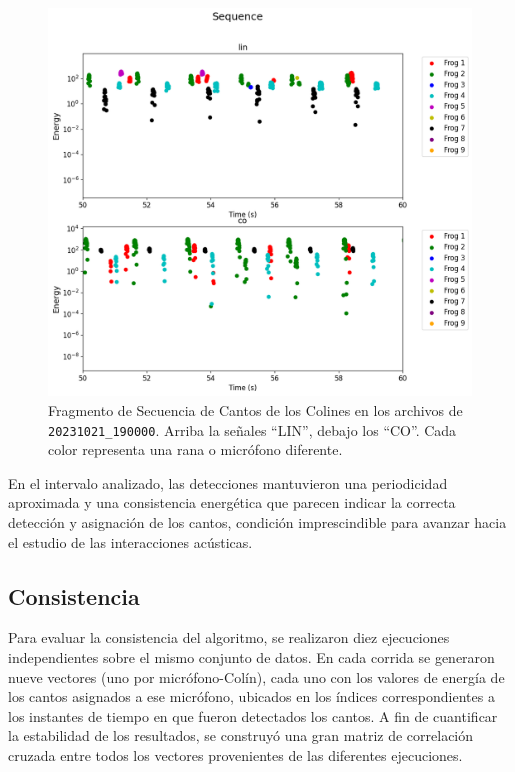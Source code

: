 \begin{figure}[ht]
    \centering
    \includegraphics[width=\columnwidth]{Graphics/sequence.png}
    \caption{Fragmento de Secuencia de Cantos de los Colines en los archivos de \texttt{20231021\_190000}. Arriba la señales “LIN”, debajo los “CO”. Cada color representa una rana o micrófono diferente.}
    \label{fig:seq}
\end{figure}

En el intervalo analizado, las detecciones mantuvieron una 
periodicidad aproximada y una consistencia energética que 
parecen indicar la correcta detección y asignación de los cantos, 
condición 
imprescindible para avanzar hacia el estudio de las 
interacciones acústicas.

\subsection{Consistencia}
\label{sec:res_consistencia}

Para evaluar la consistencia del algoritmo, se realizaron diez 
ejecuciones independientes sobre el mismo conjunto de datos. En 
cada corrida se generaron nueve vectores (uno por micrófono-Colín), 
cada uno con los valores
de energía de los cantos asignados a ese micrófono, ubicados en los 
índices correspondientes a los instantes de tiempo en que fueron 
detectados los cantos. A fin de cuantificar la 
estabilidad de los resultados, se construyó una gran matriz de 
correlación cruzada entre todos los vectores provenientes de las 
diferentes ejecuciones.

